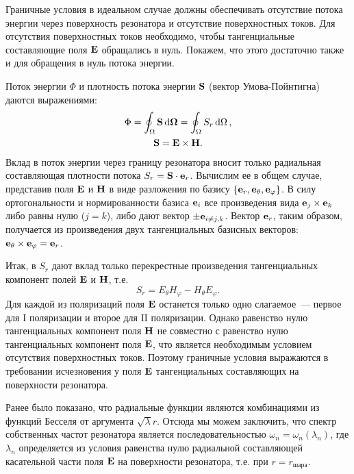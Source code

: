 \documentclass[12pt,a4paper]{article}
\begin{document}
        Граничные условия в идеальном случае должны обеспечивать отсутствие потока энергии через поверхность резонатора и отсутствие поверхностных токов. Для отсутствия поверхностных токов необходимо, чтобы тангенциальные составляющие поля $\vb{E}$ обращались в нуль. Покажем, что этого достаточно также и для обращения в нуль потока энергии.

        Поток энергии $\Phi$ и плотность потока энергии $\vb{S}$ (вектор Умова-Пойнтигна) даются выражениями:
        \begin{equation}\begin{gathered}
            \Phi = \oint_\Omega \vb{S} \dd{\vb{\Omega}}
                 = \oint_\Omega S_r \dd{\Omega} , \\
            \vb{S} = \vb{E} \times \vb{H} .
        \end{gathered}\end{equation}
        Вклад в поток энергии через границу резонатора вносит только радиальная составляющая плотности потока $S_r = \vb{S} \cdot \vb{e}_r$. Вычислим ее в общем случае, представив поля $\vb{E}$ и $\vb{H}$ в виде разложения по базису $\qty{ \vb{e}_r, \vb{e}_\theta, \vb{e}_\varphi }$. В силу ортогональности и нормированности базиса $\vb{e}_i$ все произведения вида $\vb{e}_j \times \vb{e}_k$ либо равны нулю ($j = k$), либо дают вектор $\pm \vb{e}_{i \neq j,k}$. Вектор $\vb{e}_r$, таким образом, получается из произведения двух тангенциальных базисных векторов: $\vb{e}_\theta \times \vb{e}_\varphi = \vb{e}_r$.

        Итак, в $S_r$ дают вклад только перекрестные произведения тангенциальных компонент полей $\vb{E}$ и $\vb{H}$, т.е.
        \begin{equation}
            S_r = E_\theta H_\varphi - H_\theta E_\varphi .
        \end{equation}
        Для каждой из поляризаций поля $\vb{E}$ останется только одно слагаемое~--- первое для $\mathrm{I}$ поляризации и второе для $\mathrm{II}$ поляризации. Однако равенство нулю тангенциальных компонент поля $\vb{H}$ не совместно с равенство нулю тангенциальных компонент поля $\vb{E}$, что является необходимым условием отсутствия поверхностных токов. Поэтому граничные условия выражаются в требовании исчезновения у поля $\vb{E}$ тангенциальных составляющих на поверхности резонатора.

        Ранее было показано, что радиальные функции являются комбинациями из функций Бесселя от аргумента $\sqrt\lambda r$. Отсюда мы можем заключить, что спектр собственных частот резонатора является последовательностью $\omega_n = \omega_n(\lambda_n)$, где $\lambda_n$ определяется из условия равенства нулю радиальной составляющей касательной части поля $\vb{E}$ на поверхности резонатора, т.е. при $r = r_\text{шара}$.


    \nocite{*}
    
    
\end{document}
